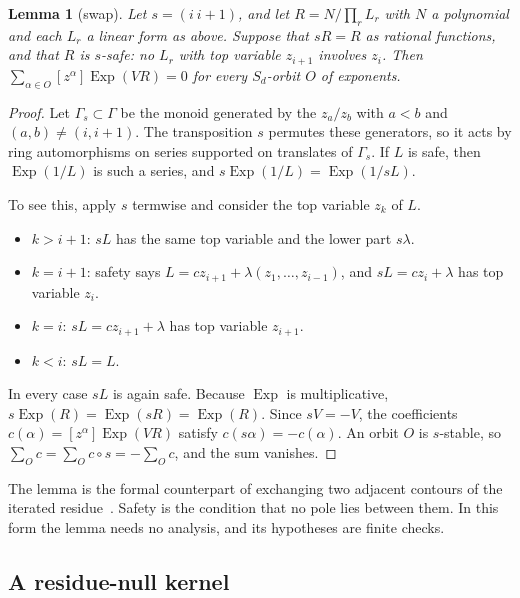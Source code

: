 \documentclass[11pt,a4paper]{article}
\theoremstyle{plain}
\newtheorem{lemma}[theorem]{Lemma}
\theoremstyle{definition}
\theoremstyle{remark}
\begin{document}
\begin{lemma}[swap]\label{lem:swap}
Let $s = (i\ i{+}1)$, and let $R = N/\prod_r L_r$ with $N$ a polynomial and each $L_r$ a linear
form as above. Suppose that $sR = R$ as rational functions, and that $R$ is \emph{$s$-safe}: no
$L_r$ with top variable $z_{i+1}$ involves $z_i$. Then
$\sum_{\alpha \in O} [z^\alpha] \operatorname{Exp}(V R) = 0$ for every $S_d$-orbit $O$ of exponents.
\end{lemma}

\begin{proof}
Let $\Gamma_s \subset \Gamma$ be the monoid generated by the $z_a/z_b$ with $a < b$ and
$(a, b) \ne (i, i+1)$. The transposition $s$ permutes these generators, so it acts by ring
automorphisms on series supported on translates of $\Gamma_s$. If $L$ is safe, then
$\operatorname{Exp}(1/L)$ is such a series, and $s\operatorname{Exp}(1/L) = \operatorname{Exp}(1/sL)$.

To see this, apply $s$ termwise and consider the top variable $z_k$ of $L$.
\begin{itemize}[nosep]
\item $k > i+1$: $sL$ has the same top variable and the lower part $s\lambda$.
\item $k = i+1$: safety says $L = c z_{i+1} + \lambda(z_1, \dots, z_{i-1})$, and $sL = c z_i + \lambda$
  has top variable $z_i$.
\item $k = i$: $sL = c z_{i+1} + \lambda$ has top variable $z_{i+1}$.
\item $k < i$: $sL = L$.
\end{itemize}
In every case $sL$ is again safe. Because $\operatorname{Exp}$ is multiplicative,
$s\operatorname{Exp}(R) = \operatorname{Exp}(sR) = \operatorname{Exp}(R)$. Since $sV = -V$, the
coefficients $c(\alpha) = [z^\alpha]\operatorname{Exp}(VR)$ satisfy $c(s\alpha) = -c(\alpha)$. An
orbit $O$ is $s$-stable, so $\sum_O c = \sum_O c\circ s = -\sum_O c$, and the sum vanishes.
\end{proof}

The lemma is the formal counterpart of exchanging two adjacent contours of the iterated
residue~\cite{FS}. Safety is the condition that no pole lies between them. In this form the lemma
needs no analysis, and its hypotheses are finite checks.

\subsection{A residue-null kernel}
\end{document}

